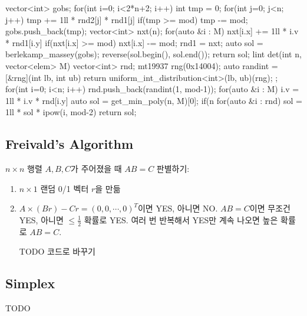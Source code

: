 \begin{cpp}
{{  }
  vector<int> gobs;
  for(int i=0; i<2*n+2; i++){
    int tmp = 0;
    for(int j=0; j<n; j++){
      tmp += 1ll * rnd2[j] * rnd1[j] %
      if(tmp >= mod) tmp -= mod;
    }
    gobs.push_back(tmp);
    vector<int> nxt(n);
    for(auto &i : M){
      nxt[i.x] += 1ll * i.v * rnd1[i.y] %
      if(nxt[i.x] >= mod) nxt[i.x] -= mod;
    }
    rnd1 = nxt;
  }
  auto sol = berlekamp_massey(gobs);
  reverse(sol.begin(), sol.end());
  return sol;
}
lint det(int n, vector<elem> M){
  vector<int> rnd;
  mt19937 rng(0x14004);
  auto randint = [&rng](int lb, int ub){
    return uniform_int_distribution<int>(lb, ub)(rng);
  };
  for(int i=0; i<n; i++) rnd.push_back(randint(1, mod-1));
  for(auto &i : M){
    i.v = 1ll * i.v * rnd[i.y] %
  }
  auto sol = get_min_poly(n, M)[0];
  if(n %
  for(auto &i : rnd) sol = 1ll * sol * ipow(i, mod-2)%
  return sol;
}
\end{cpp}

\subsection{Freivald's Algorithm}
$n \times n$ 행렬 $A,B,C$가 주어졌을 때 $AB = C$ 판별하기:\begin{enumerate}
    \item $n \times 1$ 랜덤 0/1 벡터 $r$을 만듦
    \item $A \times (Br) - Cr = (0,0,\cdots,0)^T$이면 YES, 아니면 NO.
$AB = C$이면 무조건 YES, 아니면 $\leq \frac{1}{2}$ 확률로 YES. 여러 번 반복해서 YES만 계속 나오면 높은 확률로 $AB = C$.

TODO 코드로 바꾸기
\end{enumerate}

\subsection{Simplex}

TODO
